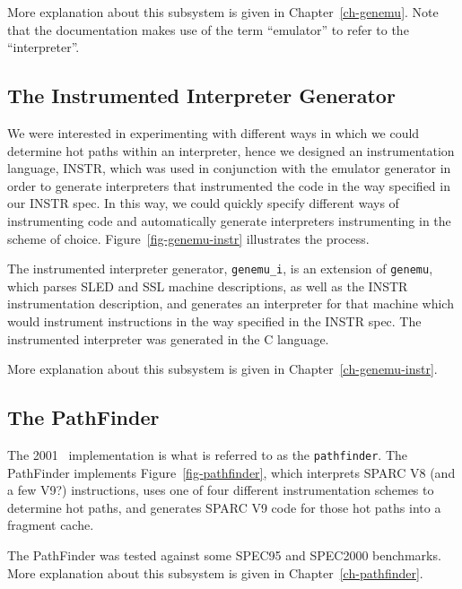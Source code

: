 More explanation about this subsystem is given in Chapter~\ref{ch-genemu}.  
Note that the documentation makes use of the term ``emulator'' 
to refer to the ``interpreter''.


\subsection{The Instrumented Interpreter Generator}

We were interested in experimenting with different ways in which 
we could determine hot paths within an interpreter, hence we 
designed an instrumentation language, INSTR, which was 
used in conjunction with the emulator generator in order to 
generate interpreters that instrumented the code in the way 
specified in our INSTR spec.  In this way, we could 
quickly specify different ways of instrumenting code and automatically
generate interpreters instrumenting in the scheme of choice. 
Figure~\ref{fig-genemu-instr} illustrates the process.  


The instrumented interpreter generator, \texttt{genemu\_i}, is an 
extension of \texttt{genemu}, which parses SLED and SSL machine descriptions, 
as well as the INSTR instrumentation description, and generates an 
interpreter for that machine which would instrument instructions in the 
way specified in the INSTR spec. 
The instrumented interpreter was generated in the C language. 

More explanation about this subsystem is given in Chapter~\ref{ch-genemu-instr}.


\subsection{The PathFinder}

The 2001 \walk\ implementation is what is referred to as the 
\texttt{pathfinder}.  The PathFinder implements Figure~\ref{fig-pathfinder}, 
which interprets SPARC V8 (and a few V9?) instructions, uses one 
of four different instrumentation schemes to determine hot paths, 
and generates SPARC V9 code for those hot paths into a fragment cache. 


The PathFinder was tested against some SPEC95 and SPEC2000 benchmarks.  
More explanation about this subsystem is given in Chapter~\ref{ch-pathfinder}. 


